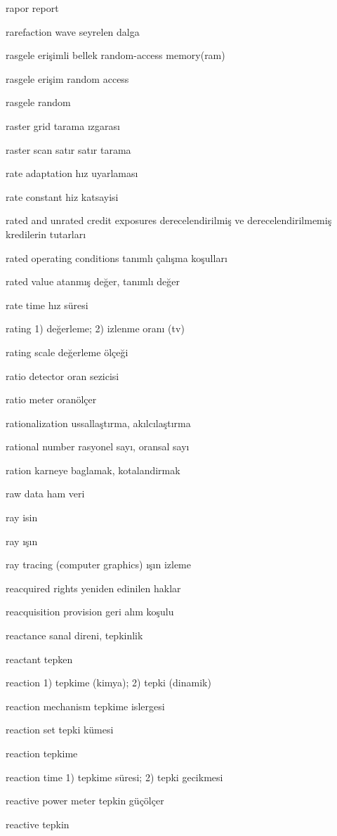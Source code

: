 \documentclass[12pt,fleqn]{article}\usepackage{../../common}
\begin{document}
rapor report

rarefaction wave seyrelen dalga

rasgele erişimli bellek random-access memory(ram)

rasgele erişim random access

rasgele random

raster grid tarama ızgarası

raster scan satır satır tarama

rate adaptation hız uyarlaması

rate constant hiz katsayisi

rated and unrated credit exposures derecelendirilmiş ve derecelendirilmemiş kredilerin tutarları

rated operating conditions tanımlı çalışma koşulları

rated value atanmış değer, tanımlı değer

rate time hız süresi

rating 1) değerleme; 2) izlenme oranı (tv)

rating scale değerleme ölçeği

ratio detector oran sezicisi

ratio meter oranölçer

rationalization ussallaştırma, akılcılaştırma\

rational number rasyonel sayı, oransal sayı

ration karneye baglamak, kotalandirmak

raw data ham veri

ray isin

ray ışın

ray tracing (computer graphics) ışın izleme

reacquired rights yeniden edinilen haklar

reacquisition provision geri alım koşulu

reactance sanal direni, tepkinlik

reactant tepken

reaction 1) tepkime (kimya); 2) tepki (dinamik)

reaction mechanism tepkime islergesi

reaction set tepki kümesi

reaction tepkime

reaction time 1) tepkime süresi; 2) tepki gecikmesi

reactive power meter tepkin güçölçer

reactive tepkin
\end{document}
